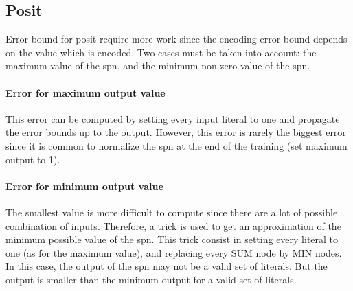 \subsection{Posit}
Error bound for posit require more work since the encoding error bound depends on the value which is encoded. Two cases must be taken into account: the maximum value of the \gls{spn}, and the minimum non-zero value of the \gls{spn}.

\paragraph{Error for maximum output value} This error can be computed by setting every input literal to one and propagate the error bounds up to the output. However, this error is rarely the biggest error since it is common to normalize the \gls{spn} at the end of the training (set maximum output to 1).

\paragraph{Error for minimum output value}

The smallest value is more difficult to compute since there are a lot of possible combination of inputs. Therefore, a trick is used to get an approximation of the minimum possible value of the \gls{spn}. This trick consist in setting every literal to one (as for the maximum value), and replacing every SUM node by MIN nodes. In this case, the output of the \gls{spn} may not be a valid set of literals. But the output is smaller than the minimum output for a valid set of literals.